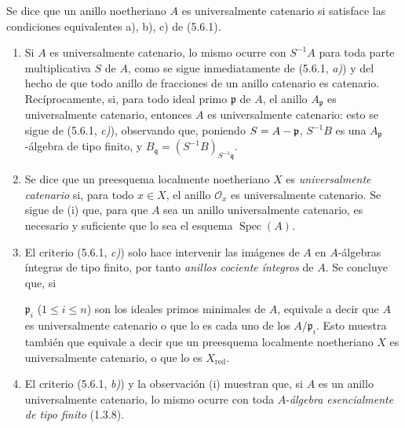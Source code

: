 \begin{definition}[5.6.2]
\label{IV.2.s5.6.2-fr}
Se dice que un anillo noetheriano $A$ es universalmente catenario si
satisface las condiciones equivalentes \textup{a), b), c)} de \textup{(5.6.1)}.
\end{definition}

\begin{remarks}[5.6.3]
\label{IV.2.s5.6.3-fr}
\begin{enumerate}
\item[(i)] Si $A$ es universalmente catenario, lo mismo ocurre con
$S^{-1}A$ para toda parte multiplicativa $S$ de $A$, como se sigue
inmediatamente de (5.6.1, \emph{a)}) y del hecho de que todo anillo de fracciones de
un anillo catenario es catenario. Recíprocamente, si, para todo ideal primo
$\mathfrak p$ de $A$, el anillo $A_{\mathfrak p}$ es universalmente
catenario, entonces $A$ es universalmente catenario: esto se sigue de
(5.6.1, \emph{c)}), observando que, poniendo $S=A-\mathfrak p$, $S^{-1}B$ es una
$A_{\mathfrak p}$-álgebra de tipo finito, y
$B_{\mathfrak q}=(S^{-1}B)_{S^{-1}\mathfrak q}$.
\item[(ii)] Se dice que un preesquema localmente noetheriano $X$ es
\emph{universalmente catenario} si, para todo $x\in X$, el anillo
$\mathcal O_x$ es universalmente catenario. Se sigue de (i) que, para que
$A$ sea un anillo universalmente catenario, es necesario y suficiente que lo
sea el esquema $\operatorname{Spec}(A)$.
\item[(iii)] El criterio (5.6.1, \emph{c)}) solo hace intervenir las imágenes de $A$
en $A$-álgebras íntegras de tipo finito, por tanto \emph{anillos cociente
íntegros} de $A$. Se concluye que, si


$\mathfrak p_i$ ($1\leq i\leq n$) son los ideales primos minimales de $A$,
equivale a decir que $A$ es universalmente catenario o que lo es cada uno de
los $A/\mathfrak p_i$. Esto muestra también que equivale a decir que un
preesquema localmente noetheriano $X$ es universalmente catenario, o que lo es
$X_{\mathrm{red}}$.
\item[(iv)] El criterio (5.6.1, \emph{b)}) y la observación (i) muestran que, si $A$
es un anillo universalmente catenario, lo mismo ocurre con toda $A$-\emph{álgebra
esencialmente de tipo finito} (1.3.8).
\end{enumerate}
\end{remarks}

